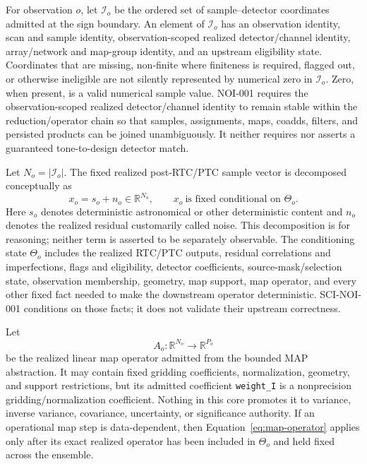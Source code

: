 \documentclass[11pt]{article}
\begin{document}
For observation $o$, let $\mathcal I_o$ be the ordered set of sample--detector
coordinates admitted at the sign boundary.  An element of $\mathcal I_o$ has
an observation identity, scan and sample identity, observation-scoped realized
detector/channel identity, array/network and map-group identity, and an
upstream eligibility state.  Coordinates that
are missing, non-finite where finiteness is required, flagged out, or otherwise
ineligible are not silently represented by numerical zero in $\mathcal I_o$.
Zero, when present, is a valid numerical sample value.  NOI-001 requires the
observation-scoped realized detector/channel identity to remain stable within
the reduction/operator chain so that samples, assignments, maps, coadds,
filters, and persisted products can be joined unambiguously.  It neither
requires nor asserts a guaranteed tone-to-design detector match.

Let $N_o=|\mathcal I_o|$.  The fixed realized post-RTC/PTC sample vector is
decomposed conceptually as
\begin{equation}
  x_o=s_o+n_o\in\mathbb R^{N_o},
  \qquad
  x_o\ \text{is fixed conditional on }\Theta_o .
  \label{eq:fixed-state}
\end{equation}
Here $s_o$ denotes deterministic astronomical or other deterministic content
and $n_o$ denotes the realized residual customarily called noise.  This
decomposition is for reasoning; neither term is asserted to be separately
observable.  The conditioning state $\Theta_o$ includes the realized RTC/PTC
outputs, residual correlations and imperfections, flags and eligibility,
detector coefficients, source-mask/selection state, observation membership,
geometry, map support, map operator, and every other fixed fact needed to make
the downstream operator deterministic.  SCI-NOI-001 conditions on those
facts; it does not validate their upstream correctness.

Let
\begin{equation}
  A_o:\mathbb R^{N_o}\longrightarrow\mathbb R^{P_o}
  \label{eq:map-operator}
\end{equation}
be the realized linear map operator admitted from the bounded MAP abstraction.
It may contain fixed gridding coefficients, normalization, geometry, and
support restrictions, but its admitted coefficient \texttt{weight\_I} is a
nonprecision gridding/normalization coefficient.  Nothing in this core
promotes it to variance, inverse variance, covariance, uncertainty, or
significance authority.  If an operational map step is data-dependent, then
Equation~\eqref{eq:map-operator} applies only after its exact realized operator
has been included in $\Theta_o$ and held fixed across the ensemble.
\end{document}
